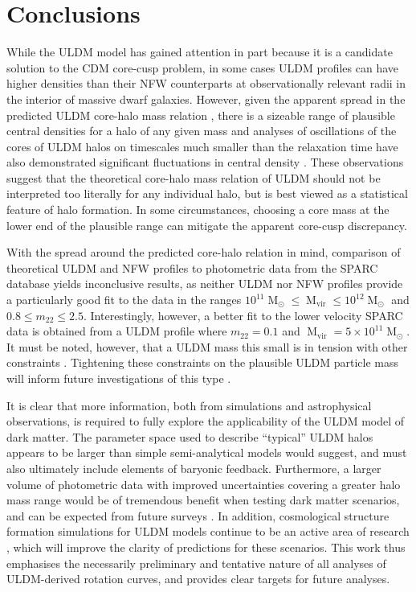 \documentclass[a4paper,11pt]{article}
\begin{document}
\section{Conclusions}\label{sec:conclusion}

While the ULDM model has gained attention in part because it is a candidate solution to  the CDM core-cusp problem, in some cases ULDM profiles can have higher densities than their NFW counterparts at observationally relevant radii in the interior of massive dwarf galaxies. However, given the apparent spread in the predicted ULDM core-halo mass relation \cite{Schive:2014hza}, there is a sizeable range of plausible central densities for a halo of any given mass and analyses of oscillations of the cores of ULDM halos on timescales much smaller than the relaxation time have also demonstrated significant fluctuations in central density \cite{Veltmaat:2018dfz}. These observations suggest that the theoretical core-halo mass relation of ULDM should not be interpreted too literally for any individual halo, but is best viewed as a statistical feature of halo formation. In some circumstances, choosing a core mass at the lower end of the plausible range can mitigate the apparent core-cusp discrepancy.  

With the spread around the predicted core-halo relation in mind, comparison of theoretical ULDM and NFW profiles to photometric data from the SPARC database yields inconclusive results, as neither ULDM nor NFW profiles provide a particularly good fit to the data in the ranges $10^{11}\operatorname{M}_{\odot}\leq \operatorname{M}_{\mathrm{vir}} \leq 10^{12}\operatorname{M}_{\odot}$ and $0.8 \leq m_{22} \leq 2.5$. Interestingly, however, a better fit to the lower velocity SPARC data is obtained from a ULDM profile where $m_{22} = 0.1$ and $\operatorname{M}_{\mathrm{vir}} = 5\times 10^{11}\operatorname{M}_{\odot}$. It must be noted, however, that a ULDM  mass this small is in tension with other constraints \cite{Amendola:2005ad, Bozek:2014uqa, Armengaud:2017nkf, Ni:2019qfa, Nebrin:2018vqt}. Tightening these constraints on the plausible ULDM particle mass will inform future investigations of this type \cite{Castellano:2019hdd, Lidz:2018fqo, Davoudiasl:2019nlo}.


It is clear that more information, both from simulations and astrophysical observations, is required to fully explore the applicability of the ULDM model of dark matter. The parameter space used to describe ``typical'' ULDM halos appears to be larger than simple semi-analytical models would suggest, and must also ultimately include elements of baryonic feedback. Furthermore, a larger volume of photometric data with improved uncertainties  covering a greater halo mass range would be of tremendous benefit when testing dark matter scenarios, and can be expected from future surveys  \cite{Simon:2019kmm}. In addition, cosmological structure formation simulations for ULDM models continue to be an active area of research \cite{Lin:2018whl, Clough:2018exo, Mocz:2015sda}, which will improve the clarity of predictions for these scenarios.  This work thus emphasises the necessarily preliminary and tentative nature of all analyses of ULDM-derived rotation curves, and provides clear targets for future analyses. 
\end{document}

